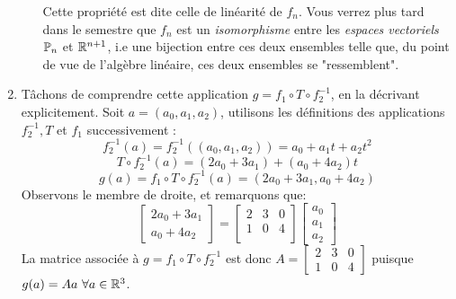 \begin{exercice}
\begin{enumerate}
\begin{enumerate}
        \noindent Cette propriété est dite celle de linéarité de $f_n$. Vous verrez plus tard dans le semestre que $f_n$ est un \textit{isomorphisme} entre les \textit{espaces vectoriels} $\P_n$ et $\R^{n+1}$, i.e une bijection entre ces deux ensembles telle que, du point de vue de l'algèbre linéaire, ces deux ensembles se "ressemblent".
    \end{enumerate}
    \item
    Tâchons de comprendre cette application $g = f_1 \circ T \circ f_2^{-1}$, en la décrivant explicitement. Soit $a = (a_0, a_1, a_2)$, utilisons les définitions des applications $f_2^{-1}, T$ et $f_1$ successivement :
    $$
    f_2^{-1}(a)= f_2^{-1}((a_0,a_1,a_2)) = a_0 + a_1t+ a_2t^2
    $$
    $$
    T\circ f_2^{-1}(a) = (2a_0 + 3a_1)+(a_0 + 4a_2)t
    $$
    $$
    g(a) = f_1 \circ T\circ f_2^{-1}(a) = (2a_0 + 3a_1, a_0 + 4a_2)
    $$
    Observons le membre de droite, et remarquons que:
    $$\begin{bmatrix} 2a_0 + 3a_1 \\ a_0 + 4a_2\end{bmatrix} = 
    \begin{bmatrix} 2 & 3 & 0 \\ 1 & 0 & 4 \\ \end{bmatrix} \begin{bmatrix} a_0 \\ a_1 \\ a_2\end{bmatrix}$$
    La matrice associée à $g = f_1 \circ T\circ f_2^{-1}$ est donc $A = \begin{bmatrix} 2 & 3 & 0 \\ 1 & 0 & 4 \end{bmatrix}$ puisque $g(a) = Aa \ \forall a \in \R^3$.\\
    

\end{enumerate}
\end{exercice}
